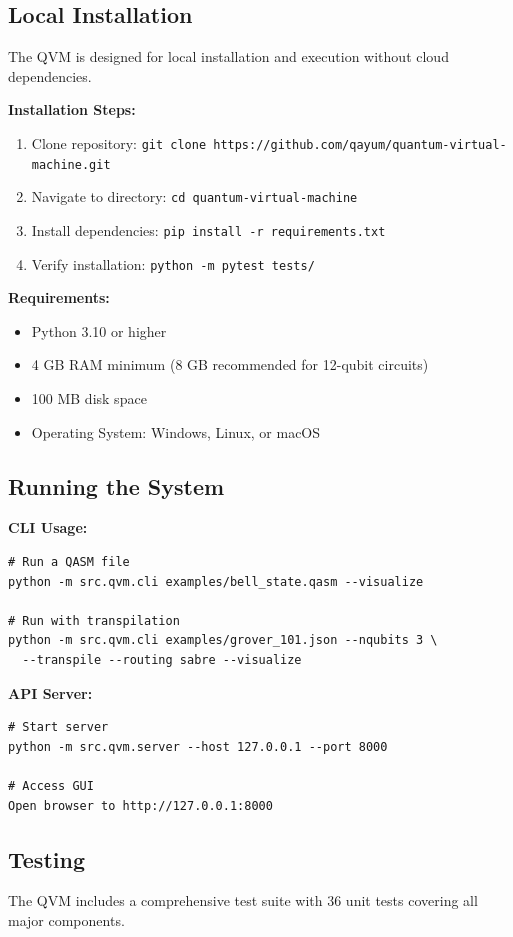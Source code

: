 \subsection{Local Installation}
The QVM is designed for local installation and execution without cloud dependencies.

\textbf{Installation Steps:}
\begin{enumerate}
\item Clone repository: \texttt{git clone https://github.com/qayum/quantum-virtual-machine.git}
\item Navigate to directory: \texttt{cd quantum-virtual-machine}
\item Install dependencies: \texttt{pip install -r requirements.txt}
\item Verify installation: \texttt{python -m pytest tests/}
\end{enumerate}

\textbf{Requirements:}
\begin{itemize}
\item Python 3.10 or higher
\item 4 GB RAM minimum (8 GB recommended for 12-qubit circuits)
\item 100 MB disk space
\item Operating System: Windows, Linux, or macOS
\end{itemize}

\subsection{Running the System}
\textbf{CLI Usage:}
\begin{verbatim}
# Run a QASM file
python -m src.qvm.cli examples/bell_state.qasm --visualize

# Run with transpilation
python -m src.qvm.cli examples/grover_101.json --nqubits 3 \
  --transpile --routing sabre --visualize
\end{verbatim}

\textbf{API Server:}
\begin{verbatim}
# Start server
python -m src.qvm.server --host 127.0.0.1 --port 8000

# Access GUI
Open browser to http://127.0.0.1:8000
\end{verbatim}

\subsection{Testing}
The QVM includes a comprehensive test suite with 36 unit tests covering all major components.

